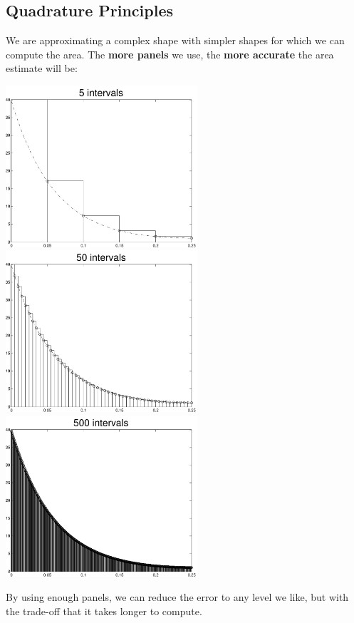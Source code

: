 \subsection*{Quadrature Principles}
We are approximating a complex shape with simpler shapes for which we
can compute the area. The {\bf more panels} we use, the {\bf more
  accurate} the area estimate will be:
\begin{center}
\includegraphics[height=6cm]{graphics/notes_06_f_lhr_5_intervals}
\includegraphics[height=6cm]{graphics/notes_06_f_lhr_50_intervals}
\includegraphics[height=6cm]{graphics/notes_06_f_lhr_500_intervals}
\end{center}
By using enough panels, we can reduce the error to any level we like,
but with the trade-off that it takes longer to compute.

